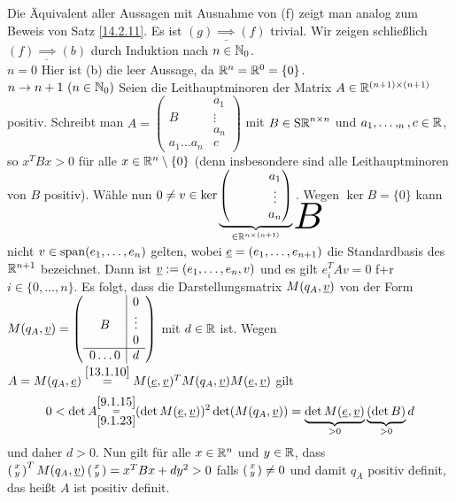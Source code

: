 \documentclass[../../main.tex]{subfiles}
\begin{document}
\begin{cproof}
Die Äquivalent aller Aussagen mit Ausnahme von (f) zeigt man analog zum Beweis von Satz \ref{14.2.11}. Es ist $\underline{(g)\implies (f)}$ trivial. Wir zeigen schließlich $\underline{(f)\implies (b)}$ durch Induktion nach $n\in\mathbb N_0$.\\

\noindent\underline{$n=0$} Hier ist (b) die leer Aussage, da $\mathbb R^n=\mathbb R^0=\{0\}$.\\
\noindent\underline{$n\to n+1\ (n\in\mathbb N_0)$} Seien die Leithauptminoren der Matrix $A\in\mathbb R^{(n+1)\times(n+1)}$ positiv. Schreibt man $A=\left(\begin{array}{c|c}& a_1\\
B & \vdots\\& a_n\\\hline a_1\ldots  a_n & c\end{array}\right)$ mit $B\in \operatorname{S\mathbb R}^{n\times n}$ und $a_1,\ldots ,_n,c\in \mathbb R$, so $x^TBx>0$ für alle $x\in\mathbb R^{n}\setminus\{0\}$ (denn insbesondere sind alle Leithauptminoren von $B$ positiv). Wähle nun $0\neq v\in\ker\underbrace{\begin{pmatrix}\tikz\node[inner sep=0pt] (a) { };&&&a_1\\&&&\vdots\\&&&a_n\end{pmatrix}}_{\in \R^{n\times(n+1)}}
\begin{tikzpicture}[overlay]
\node at (a.north) [anchor=center,yshift=-0.5cm, xshift=0.4cm, scale=3] {$B$};
\end{tikzpicture}$. Wegen $\ker B=\{0\}$ kann nicht $v\in\operatorname{span}(e_1,\ldots ,e_n)$ gelten, wobei ${\underline e}=(e_1,\ldots ,e_{n+1})$ die Standardbasis des $\mathbb R^{n+1}$ bezeichnet. Dann ist ${\underline v}:=(e_1,\ldots ,e_n,v)$ und es gilt $e_i^TAv=0$ f+r $i\in\{0,\ldots ,n\}$. Es folgt, dass die Darstellungsmatrix $M(q_A,{\underline v})$ von der Form $M(q_A,{\underline v})=\left(\begin{array}{c|c}& 0\\
B & \vdots\\& 0\\\hline 0\ldots  0 & d\end{array}\right)$ mit $d\in\mathbb R$ ist. Wegen $A=M(q_A,{\underline e})\stackrel{\ref{13.1.10}}{=}M({\underline e},{\underline v})^TM(q_A,{\underline v})M({\underline e},{\underline v})$ gilt
\begin{align*}
0<\det A\substack{\ref{9.1.15}\\=\\\ref{9.1.23}}(\det M({\underline e},{\underline v}))^2\det(M(q_A,{\underline v}))=\underbrace{\det M({\underline e},{\underline v})}_{>0}\underbrace{(\det B)}_{>0}d
\end{align*}
und daher $d>0$. Nun gilt für alle $x\in \mathbb R^n$ und $y\in \mathbb R$, dass $\left(\begin{smallmatrix}x\\y\end{smallmatrix}\right)^TM(q_A,{\underline v})\left(\begin{smallmatrix}x\\y\end{smallmatrix}\right)=x^TBx+dy^2>0$ falls $\left(\begin{smallmatrix}x\\y\end{smallmatrix}\right)\neq 0$ und damit $q_A$ positiv definit, das heißt $A$ ist positiv definit.
\end{cproof}
\end{document}
